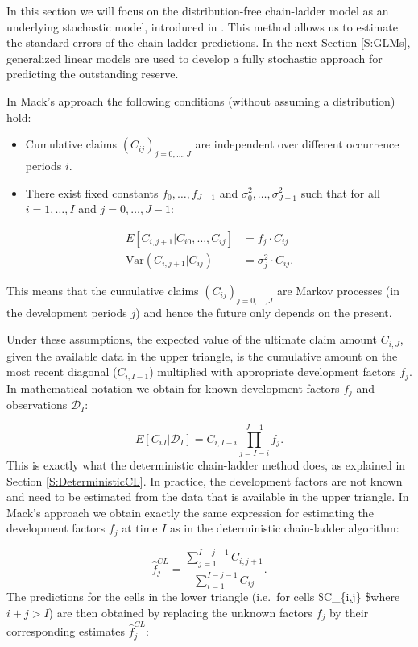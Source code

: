 \documentclass[]{book}
\begin{document}
In this section we will focus on the distribution-free chain-ladder
model as an underlying stochastic model, introduced in \citet{Mack1993}.
This method allows us to estimate the standard errors of the
chain-ladder predictions. In the next Section \ref{S:GLMs}, generalized
linear models are used to develop a fully stochastic approach for
predicting the outstanding reserve.

In Mack's approach the following conditions (without assuming a
distribution) hold:

\begin{itemize}
\item
  Cumulative claims \((C_{ij})_{j=0,\ldots,J}\) are independent over
  different occurrence periods \(i\).
\item
  There exist fixed constants \(f_0, \ldots, f_{J-1}\) and
  \(\sigma^2_0,\ldots, \sigma^2_{J-1}\) such that for all
  \(i=1,\ldots, I\) and \(j=0,\ldots,J-1\):
\end{itemize}

\[
\begin{array}{rl}
E[C_{i,j+1}|C_{i0},\ldots,C_{ij}] &= f_j \cdot C_{ij} \\
\text{Var}(C_{i,j+1}|C_{ij}) &= \sigma^2_j \cdot C_{ij}.
\end{array}
\]

This means that the cumulative claims \((C_{ij})_{j=0,\ldots,J}\) are
Markov processes (in the development periods \(j\)) and hence the future
only depends on the present.

Under these assumptions, the expected value of the ultimate claim amount
\(C_{i,J}\), given the available data in the upper triangle, is the
cumulative amount on the most recent diagonal (\(C_{i, I-1}\))
multiplied with appropriate development factors \(f_j\). In mathematical
notation we obtain for known development factors \(f_j\) and
observations \(\mathcal{D}_I\):

\[
E[C_{iJ}|\mathcal{D}_I] = C_{i,I-i} \prod_{j=I-i}^{J-1} f_j.
\] This is exactly what the deterministic chain-ladder method does, as
explained in Section \ref{S:DeterministicCL}. In practice, the
development factors are not known and need to be estimated from the data
that is available in the upper triangle. In Mack's approach we obtain
exactly the same expression for estimating the development factors
\(f_j\) at time \(I\) as in the deterministic chain-ladder algorithm:

\[
\hat{f}_j^{CL} =\frac{\sum_{j=1}^{I-j-1} C_{i,j+1}}{\sum_{i=1}^{I-j-1} C_{ij}}.
\] The predictions for the cells in the lower triangle (i.e.~for cells
\$C\_\{i,j\} \$where \(i+j>I\)) are then obtained by replacing the
unknown factors \(f_j\) by their corresponding estimates
\(\hat{f}_j^{CL}\):
\end{document}
